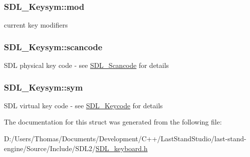 \subsubsection[{mod}]{ S\+D\+L\+\_\+\+Keysym\+::mod}\label{structSDL__Keysym_ab519d1b8a9939d3d035f7103f3208291}
current key modifiers \hypertarget{structSDL__Keysym_ad47e9120a511e2efc7ec0c6d8a5ec51e}{}
\subsubsection[{scancode}]{ S\+D\+L\+\_\+\+Keysym\+::scancode}\label{structSDL__Keysym_ad47e9120a511e2efc7ec0c6d8a5ec51e}
S\+D\+L physical key code -\/ see \hyperlink{SDL__scancode_8h_a82ab7cff701034fb40a47b5b3a02777b}{S\+D\+L\+\_\+\+Scancode} for details \hypertarget{structSDL__Keysym_a082ff1fd787b79fa6c3a445deb225f08}{}
\subsubsection[{sym}]{ S\+D\+L\+\_\+\+Keysym\+::sym}\label{structSDL__Keysym_a082ff1fd787b79fa6c3a445deb225f08}
S\+D\+L virtual key code -\/ see \hyperlink{SDL__keycode_8h_ae9265f064f13f0f74dfca26a67875171}{S\+D\+L\+\_\+\+Keycode} for details 

The documentation for this struct was generated from the following file\+:\begin{DoxyCompactItemize}
\item 
D\+:/\+Users/\+Thomas/\+Documents/\+Development/\+C++/\+Last\+Stand\+Studio/last-\/stand-\/engine/\+Source/\+Include/\+S\+D\+L2/\hyperlink{SDL__keyboard_8h}{S\+D\+L\+\_\+keyboard.\+h}\end{DoxyCompactItemize}
